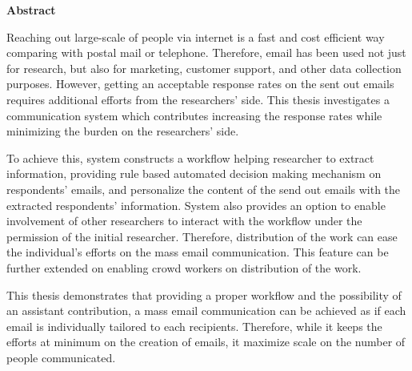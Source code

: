 
\clearemptydoublepage
{}
{}	

\vspace*{2cm}
{\Large \bf Abstract}
\vspace{1cm}

Reaching out large-scale of people via internet is a fast and cost efficient way comparing with postal mail or telephone. Therefore, email has been used not just for research, but also for marketing, customer support, and other data collection purposes. However, getting an acceptable response rates on the sent out emails requires additional efforts from the researchers' side. This thesis investigates a communication system which contributes increasing the response rates while minimizing the burden on the researchers' side. 
\vspace{1cm}

To achieve this, system constructs a workflow helping researcher to extract information, providing rule based automated decision making mechanism on respondents' emails, and personalize the content of the send out emails with the extracted respondents' information. System also provides an option to enable involvement of other researchers to interact with the workflow under the permission of the initial researcher. Therefore, distribution of the work can ease the individual's efforts on the mass email communication. This feature can be further extended on enabling crowd workers on distribution of the work.
\vspace{1cm}

This thesis demonstrates that providing a proper workflow and the possibility of an assistant contribution, a mass email communication can be achieved as if each email is individually tailored to each recipients. Therefore, while it keeps the efforts at minimum on the creation of emails, it maximize scale on the number of people communicated.
